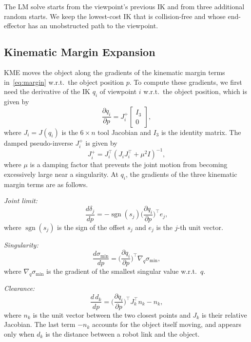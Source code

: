 \documentclass[letterpaper, journal, twoside]{IEEEtran}
\begin{document}
The LM solve starts from the viewpoint's previous IK and from three additional random starts. We keep the lowest-cost IK that is collision-free and whose end-effector has an unobstructed path to the viewpoint.

\subsection{Kinematic Margin Expansion}
\label{sec:kme}
KME moves the object along the gradients of the kinematic margin terms in~\eqref{eq:margin} w.r.t.\ the object position $p$. To compute these gradients, we first need the derivative of the IK $q_i$ of viewpoint $i$ w.r.t.\ the object position, which is given by
\begin{equation}
\frac{\partial q_i}{\partial p} = J_i^{+} \begin{bmatrix} I_3 \\ 0 \end{bmatrix} ,
\label{eq:follow}
\end{equation}
where $J_i = J(q_i)$ is the $6 \times n$ tool Jacobian and $I_3$ is the identity matrix. The damped pseudo-inverse $J_i^{+}$ is given by
\begin{equation}
J_i^{+} = J_i^{\top}(J_i J_i^{\top} + \mu^2 I)^{-1},
\label{eq:dpinv}
\end{equation}
where $\mu$ is a damping factor that prevents the joint motion from becoming excessively large near a singularity. At $q_i$, the gradients of the three kinematic margin terms are as follows.

\emph{Joint limit:}
\begin{equation}
\frac{d\delta_j}{dp} = -\operatorname{sgn}(s_j) \Big(\frac{\partial q_i}{\partial p}\Big)^{\!\top} e_j,
\label{eq:grad_joint}
\end{equation}
where $\operatorname{sgn}(s_j)$ is the sign of the offset $s_j$ and $e_j$ is the $j$-th unit vector.

\emph{Singularity:}
\begin{equation}
\frac{d\sigma_{\min}}{dp} = \Big(\frac{\partial q_i}{\partial p}\Big)^{\!\top} \nabla_q \sigma_{\min},
\label{eq:grad_sing}
\end{equation}
where $\nabla_q \sigma_{\min}$ is the gradient of the smallest singular value w.r.t.\ $q$.

\emph{Clearance:}
\begin{equation}
\frac{d\,d_k}{dp} = \Big(\frac{\partial q_i}{\partial p}\Big)^{\!\top} J_k^{\top} n_k - n_k,
\label{eq:grad_clear}
\end{equation}
where $n_k$ is the unit vector between the two closest points and $J_k$ is their relative Jacobian. The last term $-n_k$ accounts for the object itself moving, and appears only when $d_k$ is the distance between a robot link and the object.
\end{document}
